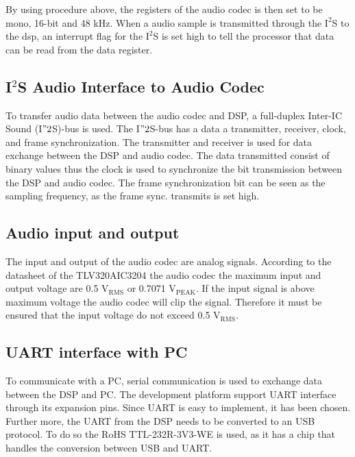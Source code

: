By using procedure above, the registers of the audio codec is then set to be mono, 16-bit and 48 kHz. When a audio sample is transmitted through the $\text{I}^2$S to the dsp, an interrupt flag for the $\text{I}^2$S is set high to tell the processor that data can be read from the data register. 

\subsection*{I$^2$S Audio Interface to Audio Codec}

To transfer audio data between the audio codec and DSP, a full-duplex Inter-IC Sound (I$"2$S)-bus is used. The I$"2$S-bus has a data a transmitter, receiver, clock, and frame synchronization. The transmitter and receiver is used for data exchange between the DSP and audio codec. The data transmitted consist of binary values thus the clock is used to synchronize the bit transmission between the DSP and audio codec. The frame synchronization bit can be seen as the sampling frequency, as the frame sync. transmits is set high.


\subsection*{Audio input and output}

The input and output of the audio codec are analog signals. According to the datasheet of the TLV320AIC3204 the audio codec the maximum input and output voltage are 0.5 $\text{V}_\text{RMS}$ or 0.7071 $\text{V}_\text{PEAK}$. If the input signal is above maximum voltage the audio codec will clip the signal. Therefore it must be ensured that the input voltage do not exceed 0.5 $\text{V}_\text{RMS}$. 

\subsection*{UART interface with PC}

To communicate with a PC, serial communication is used to exchange data between the DSP and PC. The development platform support UART interface through its expansion pins. Since UART is easy to implement, it has been chosen. Further more, the UART from the DSP needs to be converted to an USB protocol. To do so the RoHS TTL-232R-3V3-WE is used, as it has a chip that handles the conversion between USB and UART.









